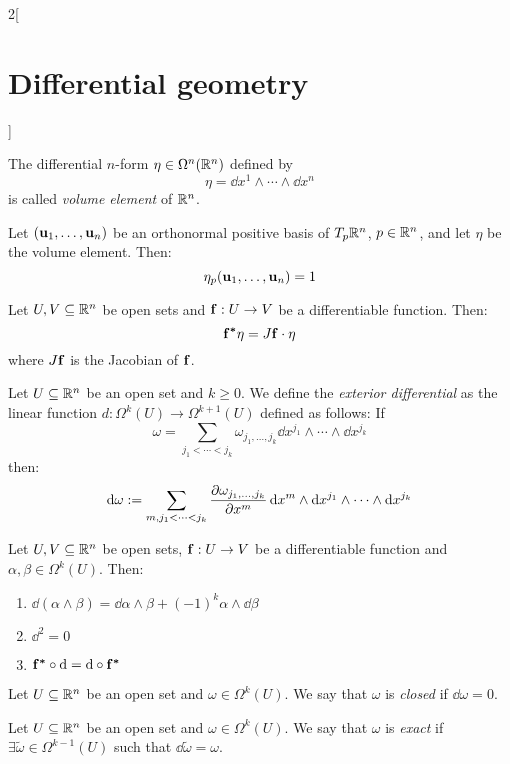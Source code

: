 \documentclass[../../../main.tex]{subfiles}
\begin{document}
\begin{multicols}{2}[\section{Differential geometry}]
\begin{proposition}
  \end{proposition}
  \begin{definition}
    The differential $n$-form $\eta\in\Omega^n(\mathbb{R}^n)$ defined by $$\eta=\dd{x^1}\wedge\cdots\wedge\dd{x^n}$$ is called \emph{volume element} of $\mathbb{R}^n$.
  \end{definition}
  \begin{lemma}
    Let $(\boldsymbol{\mathrm{u}}_1,\ldots,\boldsymbol{\mathrm{u}}_n)$ be an orthonormal positive basis of $T_p\mathbb{R}^n$, $p\in\mathbb{R}^n$, and let $\eta$ be the volume element. Then: $$\eta_p(\boldsymbol{\mathrm{u}}_1,\ldots,\boldsymbol{\mathrm{u}}_n)=1$$
  \end{lemma}
  \begin{proposition}
    Let $U,V\subseteq\mathbb{R}^n$ be open sets and $\boldsymbol{\mathrm{f}}:U\rightarrow V$ be a differentiable function. Then: $$\boldsymbol{\mathrm{f^*}}\eta=J\boldsymbol{\mathrm{f}}\cdot\eta$$ where $J\boldsymbol{\mathrm{f}}$ is the Jacobian of $\boldsymbol{\mathrm{f}}$.
  \end{proposition}
  \begin{definition}
    Let $U\subseteq\mathbb{R}^n$ be an open set and $k\geq 0$. We define the \emph{exterior differential} as the linear function $d:\Omega^k(U)\rightarrow\Omega^{k+1}(U)$ defined as follows: If $$\omega=\sum_{j_1<\cdots<j_k}\omega_{j_1,\ldots,j_k}\dd{x^{j_1}}\wedge\cdots\wedge\dd{x^{j_k}}$$
    then: $$\dd{\omega}:=\sum_{m,j_1<\cdots<j_k}\pdv{\omega_{j_1,\ldots,j_k}}{x^m}\dd{x^m}\wedge\dd{x^{j_1}}\wedge\cdots\wedge\dd{x^{j_k}}$$
  \end{definition}
  \begin{proposition}
    Let $U,V\subseteq\mathbb{R}^n$ be open sets, $\boldsymbol{\mathrm{f}}:U\rightarrow V$ be a differentiable function and $\alpha,\beta\in\Omega^k(U)$. Then:
    \begin{enumerate}
      \item $\dd{(\alpha\wedge\beta)}=\dd{\alpha}\wedge\beta+{(-1)}^k\alpha\wedge\dd{\beta}$
      \item $\dd^2=0$
      \item $\boldsymbol{\mathrm{f^*}}\circ\dd{}=\dd{}\circ\boldsymbol{\mathrm{f^*}}$
    \end{enumerate}
  \end{proposition}
  \begin{definition}
    Let $U\subseteq\mathbb{R}^n$ be an open set and $\omega\in\Omega^k(U)$. We say that $\omega$ is \emph{closed} if $\dd{\omega}=0$.
  \end{definition}
  \begin{definition}
    Let $U\subseteq\mathbb{R}^n$ be an open set and $\omega\in\Omega^k(U)$. We say that $\omega$ is \emph{exact} if $\exists \tilde{\omega}\in\Omega^{k-1}(U)$ such that $\dd{\tilde{\omega}}=\omega$.
  \end{definition}

\end{multicols}
\end{document}
